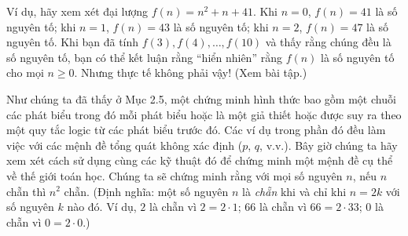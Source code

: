 \begin{notebox}
Ví dụ, hãy xem xét đại lượng $f(n) = n^2 + n + 41$. Khi $n = 0$, $f(n) = 41$ là số nguyên tố; khi $n = 1$, $f(n) = 43$ là số nguyên tố; khi $n = 2$, $f(n) = 47$ là số nguyên tố. Khi bạn đã tính $f(3), f(4), \ldots, f(10)$ và thấy rằng chúng đều là số nguyên tố, bạn có thể kết luận rằng ``hiển nhiên'' rằng $f(n)$ là số nguyên tố cho mọi $n \geq 0$. Nhưng thực tế không phải vậy! (Xem bài tập.)
\end{notebox}

Như chúng ta đã thấy ở Mục 2.5, một chứng minh hình thức bao gồm một chuỗi các phát biểu trong đó mỗi phát biểu hoặc là một giả thiết hoặc được suy ra theo một quy tắc logic từ các phát biểu trước đó. Các ví dụ trong phần đó đều làm việc với các mệnh đề tổng quát không xác định ($p$, $q$, v.v.). Bây giờ chúng ta hãy xem xét cách sử dụng cùng các kỹ thuật đó để chứng minh một mệnh đề cụ thể về thế giới toán học. Chúng ta sẽ chứng minh rằng với mọi số nguyên $n$, nếu $n$ chẵn thì $n^2$ chẵn. (Định nghĩa: một số nguyên $n$ là \emph{chẵn} khi và chỉ khi $n = 2k$ với số nguyên $k$ nào đó. Ví dụ, $2$ là chẵn vì $2 = 2 \cdot 1$; $66$ là chẵn vì $66 = 2 \cdot 33$; $0$ là chẵn vì $0 = 2 \cdot 0$.)


